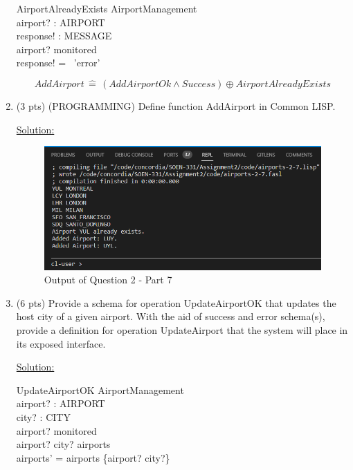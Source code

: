 \documentclass[12pt]{article}
\begin{document}
\begin{spacing}{1.5}
\begin{enumerate}
		      \begin{schema}{AirportAlreadyExists}
		      	\Xi AirportManagement \\
		      	airport? : AIRPORT \\
		      	response! : MESSAGE \\
		      	\where
		      	airport? \in monitored \\
		      	response! = \, 'error' \\
		      \end{schema}
		      $$AddAirport \, \hat{=} \, (AddAirportOk \land Success) \oplus AirportAlreadyExists$$
		      
		\item (3 pts) (PROGRAMMING) Define function AddAirport in Common LISP.
		              
		      \underline{Solution:}
		      
		      
		      
		      \begin{figure}[htp]
		      	\centering
		      	\includegraphics[width=1\textwidth]{static/airports-2-7.PNG}
		      	\caption{Output of Question 2 - Part 7}
		      \end{figure}
		      \newpage
		\item (6 pts) Provide a schema for operation UpdateAirportOK that updates the host city
		      of a given airport. With the aid of success and error schema(s), provide a definition
		      for operation UpdateAirport that the system will place in its exposed interface.
		      
		      \underline{Solution:}
		      
		      \begin{schema}{UpdateAirportOK}
		      	\Delta AirportManagement \\
		      	airport? : AIRPORT \\
		      	city? : CITY \\
		      	\where
		      	airport? \in monitored \\
		      	airport? \mapsto city? \notin airports \\
		      	airports' = airports \oplus \{airport? \mapsto city?\} \\
		      \end{schema}
		      

\end{enumerate}
\end{spacing}
\end{document}
